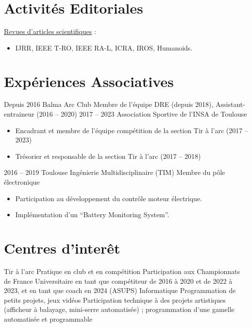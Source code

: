 \documentclass[11pt,a4paper,sans]{moderncv}         %
\newcommand{\items}{\item \hspace{2mm}}
\begin{document}
\section{Activit\'es  Editoriales}
\large{\underline{Revues d'articles scientifiques} :}
\begin{itemize}%
\items IJRR, IEEE T-RO, IEEE RA-L, ICRA, IROS, Humanoids.
\end{itemize}

\section{Exp\'eriences Associatives}
\cventry
{Depuis 2016}
{Balma Arc Club}
{Membre de l'\'equipe DRE (depuis 2018), Assistant-entraineur (2016 -- 2020)}
{}
{}
{}
%
\cventry
{2017 -- 2023}
{Association Sportive de l'INSA de Toulouse}
{}
{}
{}
{
  \begin{itemize}
    \item Encadrant et membre de l'\'equipe comp\'etition de la section Tir \`a l'arc (2017 -- 2023)
    \item Tr\'esorier et responsable de la section Tir \`a l'arc (2017 -- 2018)
  \end{itemize}
}
%
\cventry
{2016 -- 2019}
{Toulouse Ing\'enierie Multidisciplinaire (TIM)}
{Membre du p\^ole \'electronique}
{}
{}
{
  \begin{itemize}
    \item Participation au d\'eveloppement du contr\^ole moteur \'electrique.
    \item Impl\'ementation d'un ``Battery Monitoring System''.
  \end{itemize}
}
%

\section{Centres d'inter\^et}

\cventry
{Tir \`a l'arc}
{Pratique en club et en comp\'etition}
{Participation aux Championnats de France Universitaire en tant que comp\'etiteur de 2016 \`a 2020 et de 2022 \`a 2023, et en tant que coach en 2024 (ASUPS)}
{}
{}
{}
%
\cventry
{Informatique}
{Programmation de petits projets, jeux vid\'eos}
{Participation technique \`a des projets artistiques (afficheur \`a balayage, mini-serre automatis\'ee) ; programmation d'une gamelle automatis\'ee et programmable}
{}
{}
{}
%





\label{dernierepage}
\end{document}
